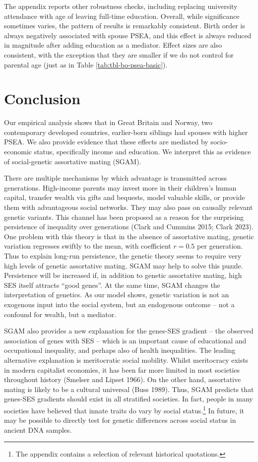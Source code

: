 \documentclass[
  12pt,
]{article}
\theoremstyle{definition}
\theoremstyle{definition}
\theoremstyle{definition}
\theoremstyle{definition}
\theoremstyle{remark}
\begin{document}
The appendix reports other robustness checks, including replacing university
attendance with age of leaving full-time education. Overall, while significance
sometimes varies, the pattern of results is remarkably consistent. Birth order is
always negatively associated with spouse PSEA, and this effect is always reduced
in magnitude after adding education as a mediator. Effect sizes are also
consistent, with the exception that they are smaller if we do not control for
parental age (just as in Table \ref{tab:tbl-bo-psea-basic}).

\hypertarget{conclusion}{%
\section{Conclusion}\label{conclusion}}

Our empirical analysis shows that in Great Britain and Norway, two contemporary
developed countries, earlier-born siblings had spouses with
higher PSEA. We also provide evidence that these effects are mediated by
socio-economic status, specifically income and education. We interpret this as
evidence of social-genetic assortative mating (SGAM).

There are multiple mechanisms by which advantage is transmitted across
generations. High-income parents may invest more in their children's human
capital, transfer wealth via gifts and bequests, model valuable skills, or
provide them with advantageous social networks. They may also pass on causally
relevant genetic variants. This channel has been proposed as a reason for the
surprising persistence of inequality over generations
(Clark and Cummins 2015; Clark 2023). One problem with this
theory is
that in the absence of assortative mating, genetic variation regresses swiftly
to the mean, with coefficient \(r = 0.5\) per generation. Thus to explain long-run
persistence, the genetic theory seems to require very high levels of genetic
assortative mating. SGAM may help to solve this puzzle. Persistence will be
increased if, in addition to genetic assortative mating, high SES itself
attracts ``good genes''. At the same time, SGAM changes the interpretation of
genetics. As our model shows, genetic variation is not an exogenous input into
the social system, but an endogenous outcome -- not a confound for wealth, but a mediator.

SGAM also provides a new explanation for the genes-SES gradient -- the observed
association of genes with SES -- which is an important cause of educational
and occupational inequality, and perhaps also of health inequalities. The
leading alternative explanation is meritocratic social mobility. Whilst
meritocracy exists in modern capitalist economies, it has been far more limited
in most societies throughout history (Smelser and Lipset 1966). On the other hand,
assortative mating is likely to be a cultural universal (Buss 1989). Thus,
SGAM predicts that genes-SES gradients should exist in all stratified societies.
In fact, people in many societies have believed that innate traits do vary by
social status.\footnote{The appendix contains a selection of relevant historical quotations.} In future, it may be possible to directly test for
genetic differences across social status in ancient DNA samples.
\end{document}
